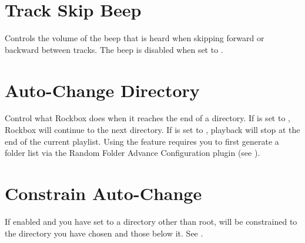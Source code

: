 \section{Track Skip Beep}
  Controls the volume of the beep that is heard when
  skipping forward or backward between tracks. The beep is disabled when
  set to .


\section{Auto-Change Directory}
  Control what Rockbox does when it reaches the end
  of a directory. If  is set to ,
  Rockbox will continue to the next directory. If
   is set to , playback will stop at
  the end of the current playlist.  Using the  feature requires
  you to first generate a folder list via the Random Folder Advance Configuration
  plugin (see ).\\



\section{\label{ref:ConstrainAutoChange}Constrain Auto-Change}
  If enabled and you have set  to a directory
  other than root,  will be constrained to the
  directory you have chosen and those below it.
  See .


